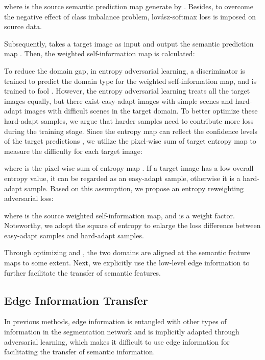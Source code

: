 \documentclass[sigconf]{acmart}
\begin{document}
where  is the source semantic prediction map generate by . Besides, to overcome the negative effect of class imbalance problem, lov{\'a}sz-softmax loss \cite{berman2018lovasz} is imposed on source data.

\par Subsequently,  takes a target image as input and output the semantic prediction map . Then, the weighted self-information map  is calculated:


\par To reduce the domain gap, in entropy adversarial learning, a discriminator  is trained to predict the domain type for the weighted self-information map, and  is trained to fool . However, the entropy adversarial learning treats all the target images equally, but there exist easy-adapt images with simple scenes and hard-adapt images with difficult scenes in the target domain. To better optimize these hard-adapt samples, we argue that harder samples need to contribute more loss during the training stage. Since the entropy map can reflect the confidence levels of the target predictions \cite{vu2019advent}, we utilize the pixel-wise sum of target entropy map to measure the difficulty for each target image: 

where  is the pixel-wise sum of entropy map . If a target image has a low overall entropy value, it can be regarded as an easy-adapt sample, otherwise it is a hard-adapt sample. Based on this assumption, we propose an entropy reweighting adversarial loss:

where  is the source weighted self-information map, and  is a weight factor. Noteworthy, we adopt the square of entropy to enlarge the loss difference between easy-adapt samples and hard-adapt samples. 

\par Through optimizing  and , the two domains are aligned at the semantic feature maps to some extent. Next, we explicitly use the low-level edge information to further facilitate the transfer of semantic features.

\subsection{Edge Information Transfer}
\par In previous methods, edge information is entangled with other types of information in the segmentation network and is implicitly adapted through adversarial learning, which makes it difficult to use edge information for facilitating the transfer of semantic information.
\end{document}
